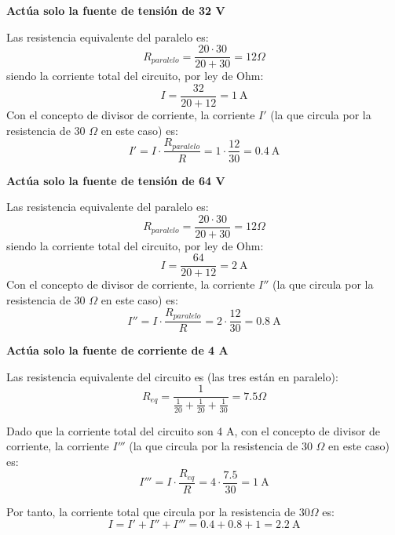 \textbf{Actúa solo la fuente de tensión de 32 V}

Las resistencia equivalente del paralelo es:
\begin{equation*}
  R_{paralelo}=\dfrac{20\cdot 30}{20+30}=12\Omega
\end{equation*}
siendo la corriente total del circuito, por ley de Ohm:
\begin{equation*}
  I=\dfrac{32}{20+12}=\qty{1}{\ampere}
\end{equation*}
Con el concepto de divisor de corriente, la corriente $I'$ (la que
circula por la resistencia de 30 $\Omega$ en este caso) es:
\begin{equation*}
  I'=I\cdot \dfrac{R_{paralelo}}{R}=1\cdot\dfrac{12}{30}=\qty{0.4}{\ampere}
\end{equation*}

\textbf{Actúa solo la fuente de tensión de 64 V}

Las resistencia equivalente del paralelo es:
\begin{equation*}
  R_{paralelo}=\dfrac{20\cdot 30}{20+30}=12\Omega
\end{equation*}
siendo la corriente total del circuito, por ley de Ohm:
\begin{equation*}
  I=\dfrac{64}{20+12}=\qty{2}{\ampere}
\end{equation*}
Con el concepto de divisor de corriente, la corriente $I''$ (la que
circula por la resistencia de 30 $\Omega$ en este caso) es:
\begin{equation*}
  I''=I\cdot \dfrac{R_{paralelo}}{R
  }=2\cdot\dfrac{12}{30}=\qty{0.8}{\ampere}
\end{equation*}

\textbf{Actúa solo la fuente de corriente de 4 A}

Las resistencia equivalente del circuito es (las tres están en
paralelo):
\begin{equation*}
  R_{eq}=\dfrac{1}{\frac{1}{20}+\frac{1}{20}+\frac{1}{30}}=7.5\Omega
\end{equation*}

Dado que la corriente total del circuito son 4 A, con el concepto de
divisor de corriente, la corriente $I'''$ (la que circula por la
resistencia de 30 $\Omega$ en este caso) es:
\begin{equation*}
  I'''=I\cdot \dfrac{R_{eq}}{R}=4\cdot\dfrac{7.5}{30}=\qty{1}{\ampere}
\end{equation*}

Por tanto, la corriente total que circula por la resistencia de
$30\Omega$ es:
\begin{equation*}
  I=I'+I''+I'''=0.4+0.8+1=\qty{2.2}{\ampere}
\end{equation*}

